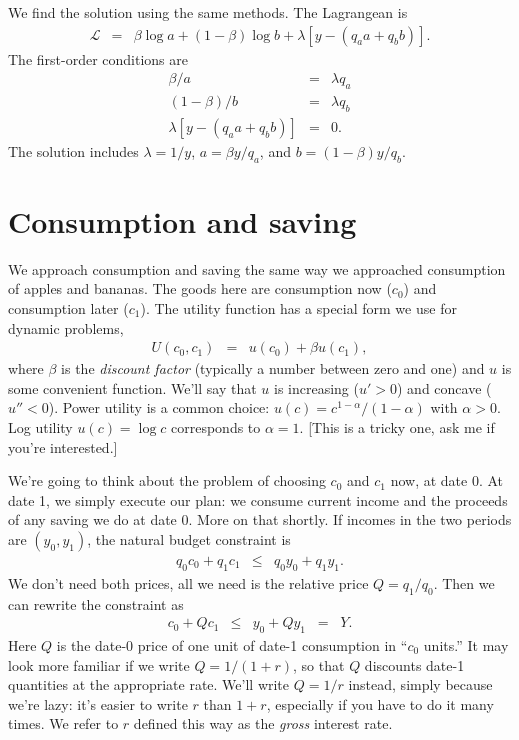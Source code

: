 \documentclass[11pt]{article}
\begin{document}
We find the solution using the same methods.
The Lagrangean is
\begin{eqnarray*}
    \mathcal{L} &=& \beta \log a + (1-\beta) \log b
            + \lambda \left[ y - (q_a a + q_b b) \right] .
\end{eqnarray*}
The first-order conditions are
\begin{eqnarray*}
        \beta / a &=& \lambda q_a \\
        (1-\beta) / b &=& \lambda q_b \\
   \lambda \left[ y - (q_a a + q_b b) \right] &=& 0 .
\end{eqnarray*}
The solution includes $\lambda = 1/y $,
$ a = \beta y/q_a $, and $b = (1-\beta) y /q_b $.


\section{Consumption and saving}

We approach consumption and saving the same way we approached
consumption of apples and bananas.
The goods here are consumption now ($c_0$)
and consumption later ($c_1$).
The utility function has a special form we use for dynamic
problems,
\begin{eqnarray}
    U(c_0,c_1) &=& u(c_0) + \beta u(c_1) ,
    \label{eq:utility-2period}
\end{eqnarray}
where $\beta$ is the {\it discount factor\/} (typically a number between zero and one)
and $u$ is some convenient function.
We'll say that $u$ is increasing ($u' > 0$) and concave ($u'' < 0$).
Power utility is a common choice:
$u(c) = c^{1-\alpha}/(1-\alpha)$ with $\alpha > 0$.
Log utility $u(c) = \log c$ corresponds to $\alpha = 1$.
[This is a tricky one, ask me if you're interested.]

We're going to think about the problem of choosing
$c_0$ and $c_1$ now, at date 0.
At date 1, we simply execute our plan:
we consume current income and the proceeds of any saving we do at date 0.
More on that shortly.
If incomes in the two periods are $(y_0,y_1)$,
the natural budget constraint is
\begin{eqnarray*}
   q_0 c_0 + q_1 c_1 &\leq& q_0 y_0 + q_1 y_1  .
\end{eqnarray*}
We don't need both prices, all we need
is the relative price $Q = q_1/q_0$.
Then we can rewrite the constraint as
\begin{eqnarray}
    c_0 + Q c_1 &\leq& y_0 + Q y_1  \;\;=\;\; Y .
    \label{eq:budget-2period}
\end{eqnarray}
Here $Q$ is the date-0 price of one unit of date-1 consumption in ``$c_0$ units.''
It may look more familiar if we write $Q = 1/(1+r)$, so that
$Q$ discounts date-1 quantities at the appropriate rate.
We'll write $Q = 1/r$ instead, simply because we're lazy:
it's easier to write $r$ than $1+r$, especially if you have
to do it many times.
We refer to $r$ defined this way as the {\it gross\/} interest rate.
\end{document}
